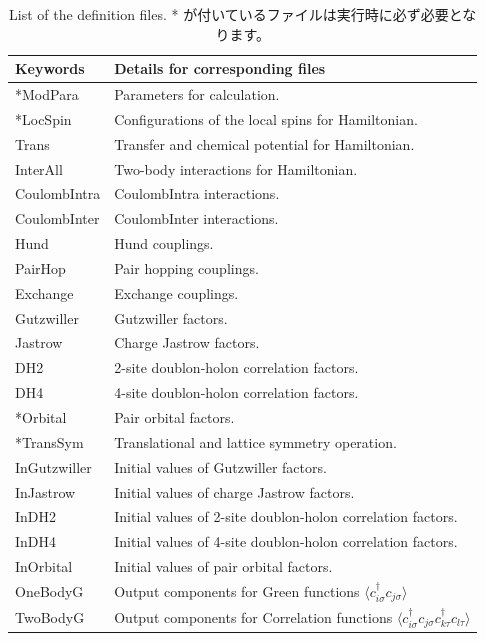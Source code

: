  \begin{table}[h!]
\begin{center}
  \begin{tabular}{|ll|} \hline
           Keywords     & Details for corresponding files       \\   \hline\hline
           *ModPara       &  Parameters for calculation.        \\ \hline 
           *LocSpin         &  Configurations of the local spins for Hamiltonian.         \\ 
           Trans       &   Transfer and chemical potential for Hamiltonian.  \\
           InterAll  &   Two-body interactions for Hamiltonian. \\  
           CoulombIntra  &   CoulombIntra interactions. \\  
           CoulombInter  &   CoulombInter  interactions. \\  
           Hund  &   Hund couplings. \\  
           PairHop  &  Pair hopping couplings. \\  
           Exchange  &  Exchange couplings. \\  \hline
           Gutzwiller & Gutzwiller factors.\\
           Jastrow & Charge Jastrow factors.\\
           DH2 & 2-site doublon-holon correlation factors.\\
           DH4 & 4-site doublon-holon correlation factors.\\
           *Orbital & Pair orbital factors.\\
           *TransSym & Translational and lattice symmetry operation. \\ \hline
           InGutzwiller & Initial values of Gutzwiller factors.\\
           InJastrow & Initial values of charge Jastrow factors.\\
           InDH2 & Initial values of 2-site doublon-holon correlation factors.\\
           InDH4 & Initial values of 4-site doublon-holon correlation factors.\\
           InOrbital & Initial values of pair orbital factors.\\ \hline
           OneBodyG         &   Output components for Green functions $\langle c_{i\sigma}^{\dagger}c_{j\sigma}\rangle$           \\   
           TwoBodyG &   Output components for Correlation functions $\langle c_{i\sigma}^{\dagger}c_{j\sigma}c_{k\tau}^{\dagger}c_{l\tau}\rangle$  \\   \hline
  \end{tabular}
\end{center}
\caption{List of the definition files. * が付いているファイルは実行時に必ず必要となります。}
\label{Table:Defs}
\end{table}%

